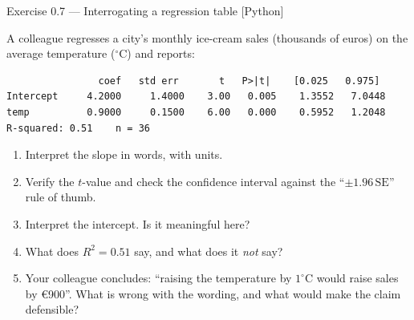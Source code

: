 \documentclass[aspectratio=169,11pt]{beamer}
\begin{document}
\begin{frame}[fragile]{Exercise 0.7 --- Interrogating a regression table [Python]}
  \begin{exercise}
    \scriptsize
    A colleague regresses a city's monthly ice-cream sales (thousands of
    euros) on the average temperature ($^\circ$C) and reports:
\begin{lstlisting}
                coef   std err       t   P>|t|    [0.025   0.975]
Intercept     4.2000     1.4000    3.00   0.005    1.3552   7.0448
temp          0.9000     0.1500    6.00   0.000    0.5952   1.2048
R-squared: 0.51    n = 36
\end{lstlisting}
    \begin{enumerate}
      \item Interpret the slope in words, with units.
      \item Verify the $t$-value and check the confidence interval against the
            ``$\pm 1.96\,\mathrm{SE}$'' rule of thumb.
      \item Interpret the intercept. Is it meaningful here?
      \item What does $R^2 = 0.51$ say, and what does it \emph{not} say?
      \item Your colleague concludes: ``raising the temperature by
            $1^\circ$C would raise sales by \euro 900''. What is wrong with
            the wording, and what would make the claim defensible?
    \end{enumerate}
  \end{exercise}
\end{frame}
\end{document}
